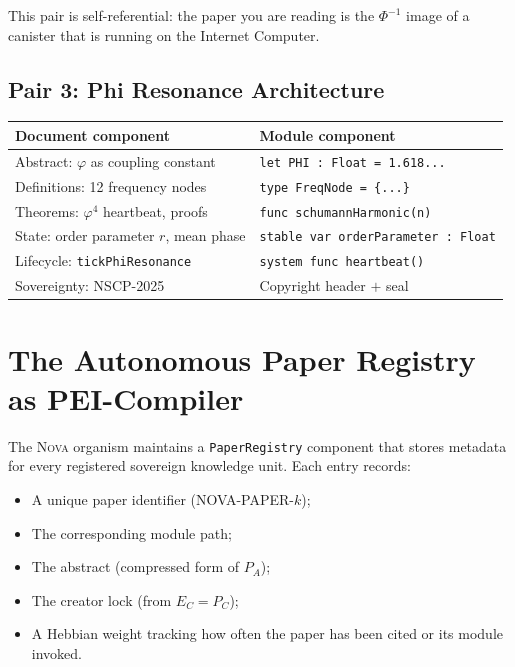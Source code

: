 \documentclass[12pt]{article}
\newcommand{\PHI}{\varphi}
\begin{document}
This pair is self-referential: the paper you are reading is the $\Phi^{-1}$
image of a canister that is running on the Internet Computer.

\subsection{Pair 3: Phi Resonance Architecture}

\begin{center}
\begin{tabular}{ll}
  \toprule
  Document component & Module component \\
  \midrule
  Abstract: $\PHI$ as coupling constant    & \texttt{let PHI : Float = 1.618...} \\
  Definitions: 12 frequency nodes          & \texttt{type FreqNode = \{...\}} \\
  Theorems: $\PHI^4$ heartbeat, proofs     & \texttt{func schumannHarmonic(n)} \\
  State: order parameter $r$, mean phase   & \texttt{stable var orderParameter : Float} \\
  Lifecycle: \texttt{tickPhiResonance}     & \texttt{system func heartbeat()} \\
  Sovereignty: NSCP-2025                   & Copyright header $+$ seal \\
  \bottomrule
\end{tabular}
\end{center}

\section{The Autonomous Paper Registry as PEI-Compiler}
\label{sec:registry}

The \textsc{Nova} organism maintains a \texttt{PaperRegistry} component that
stores metadata for every registered sovereign knowledge unit.  Each entry
records:
\begin{itemize}[leftmargin=*]
  \item A unique paper identifier (NOVA-PAPER-$k$);
  \item The corresponding module path;
  \item The abstract (compressed form of $P_A$);
  \item The creator lock (from $E_C = P_C$);
  \item A Hebbian weight tracking how often the paper has been cited or its
    module invoked.
\end{itemize}
\end{document}
